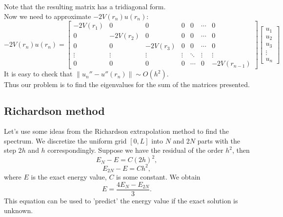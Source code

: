 \documentclass[a4paper, 12pt]{article}
\begin{document}
Note that the resulting matrix has a tridiagonal form.\\
Now we need to approximate $-2V(r_n)u(r_n)$:
$$-2V(r_n)u(r_n) = \begin{bmatrix}
-2V(r_1) & 0 &0&0&0& \cdots & 0 \\
0 & -2V(r_2) & 0& 0&0&\cdots & 0 \\  
0&0 & -2V(r_3) & 0& 0&\cdots & 0 \\  
\vdots & \vdots &\vdots & \vdots & \ddots & \vdots& \vdots  \\
0 & 0&0 &0& \cdots &0 & -2V(r_{n-1})
\end{bmatrix}
\begin{bmatrix}
u_1
\\
u_2
\\
u_3
\\
\vdots
\\
u_n
\end{bmatrix}$$
It is easy to check that $\displaystyle{\| u_n''-u''(r_n) \| \sim O(h^2)}.$\\
Thus our problem is to find the eigenvalues for the sum of the matrices presented.

\subsection{Richardson method}
Let's use some ideas from the Richardson extrapolation method to find the spectrum. We discretize the uniform grid $[0, L]$ into $N$ and 2$N$ parts with the step 2$h$ and $h$ correspondingly. Suppose we have the residual of the order $h^2$, then 
$$E_{N} - E = C (2h)^2,$$
$$E_{2N} - E = C h^2,$$
where $E$ is the exact energy value, $C$ is some constant. We obtain 
\begin{equation}
	E = \frac{4 E_N - E_{2N}}{3}.
\end{equation}
This equation can be used to 'predict' the energy value if the exact solution is unknown.
\end{document}
